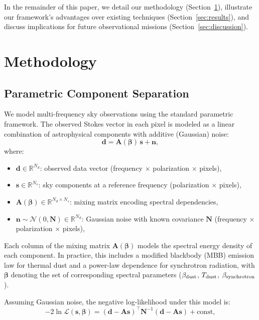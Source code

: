 \documentclass[fleqn,usenatbib]{mnras}
\begin{document}
In the remainder of this paper, we detail our methodology (Section~\ref{sec:methodology}), illustrate our framework’s advantages over existing techniques (Section~\ref{sec:results}), and discuss implications for future observational missions (Section~\ref{sec:discussion}).

\section{Methodology}
\label{sec:methodology}

\subsection{Parametric Component Separation}

We model multi-frequency sky observations using the standard parametric framework. The observed Stokes vector in each pixel is modeled as a linear combination of astrophysical components with additive (Gaussian) noise:
\begin{equation}
    \mathbf{d} = \mathbf{A}(\boldsymbol{\beta})\,\mathbf{s} + \mathbf{n},
    \label{eq:data_model}
\end{equation}
where:
\begin{itemize}
    \item \( \mathbf{d} \in \mathbb{R}^{N_d} \): observed data vector (frequency $\times$ polarization $\times$ pixels),
    \item \( \mathbf{s} \in \mathbb{R}^{N_s} \): sky components at a reference frequency (polarization $\times$ pixels),
    \item \( \mathbf{A}(\boldsymbol{\beta}) \in \mathbb{R}^{N_d \times N_s} \): mixing matrix encoding spectral dependencies,
    \item \( \mathbf{n} \sim \mathcal{N}(0, \mathbf{N}) \in \mathbb{R}^{N_d} \): Gaussian noise with known covariance \( \mathbf{N} \) (frequency $\times$ polarization $\times$ pixels),
\end{itemize}


Each column of the mixing matrix \( \mathbf{A}(\boldsymbol{\beta}) \) models the spectral energy density of each component. In practice, this includes a modified blackbody (MBB) emission law for thermal dust and a power-law dependence for synchrotron radiation, with \( \boldsymbol{\beta} \) denoting the set of corresponding spectral parameters ($\beta_{\rm dust}$, $T_{\rm dust}$, $\beta_{\rm synchrotron}$). 

Assuming Gaussian noise, the negative log-likelihood under this model is:
\begin{equation}
    -2 \ln \mathcal{L}(\mathbf{s}, \boldsymbol{\beta}) = (\mathbf{d} - \mathbf{A} \mathbf{s})^\top \mathbf{N}^{-1} (\mathbf{d} - \mathbf{A} \mathbf{s}) + \text{const},
    \label{eq:nll_joint}
\end{equation}
\end{document}
